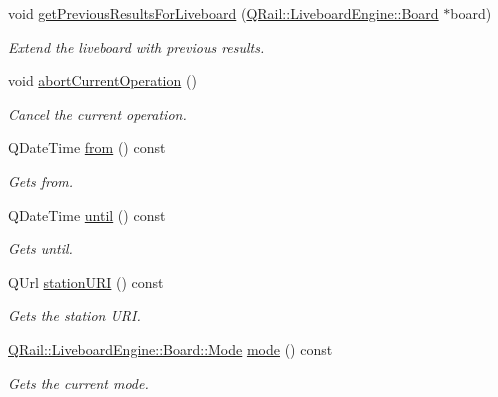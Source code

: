 \begin{DoxyCompactItemize}
void \mbox{\hyperlink{classQRail_1_1LiveboardEngine_1_1Factory_a01901090bd5f8be7d6f7c7f52ed88db0}{get\+Previous\+Results\+For\+Liveboard}} (\mbox{\hyperlink{classQRail_1_1LiveboardEngine_1_1Board}{Q\+Rail\+::\+Liveboard\+Engine\+::\+Board}} $\ast$board)
\begin{DoxyCompactList}\small\item\em Extend the liveboard with previous results. \end{DoxyCompactList}\item 
void \mbox{\hyperlink{classQRail_1_1LiveboardEngine_1_1Factory_a5a581cb60c12dea0af977ea08c64e0c8}{abort\+Current\+Operation}} ()
\begin{DoxyCompactList}\small\item\em Cancel the current operation. \end{DoxyCompactList}\item 
Q\+Date\+Time \mbox{\hyperlink{classQRail_1_1LiveboardEngine_1_1Factory_a883b4e0b9af113d312c6828b64d07258}{from}} () const
\begin{DoxyCompactList}\small\item\em Gets from. \end{DoxyCompactList}\item 
Q\+Date\+Time \mbox{\hyperlink{classQRail_1_1LiveboardEngine_1_1Factory_a040529d305e2cc4d19b68f48817f7a90}{until}} () const
\begin{DoxyCompactList}\small\item\em Gets until. \end{DoxyCompactList}\item 
Q\+Url \mbox{\hyperlink{classQRail_1_1LiveboardEngine_1_1Factory_aad0820a9d150f8adb8599cf5be4855d0}{station\+U\+RI}} () const
\begin{DoxyCompactList}\small\item\em Gets the station U\+RI. \end{DoxyCompactList}\item 
\mbox{\hyperlink{classQRail_1_1LiveboardEngine_1_1Board_a0ab6d318f405895f62c6e98cb2d86c6e}{Q\+Rail\+::\+Liveboard\+Engine\+::\+Board\+::\+Mode}} \mbox{\hyperlink{classQRail_1_1LiveboardEngine_1_1Factory_a03deeb607999848d402a5a3af40967f4}{mode}} () const
\begin{DoxyCompactList}\small\item\em Gets the current mode. \end{DoxyCompactList}\end{DoxyCompactItemize}
